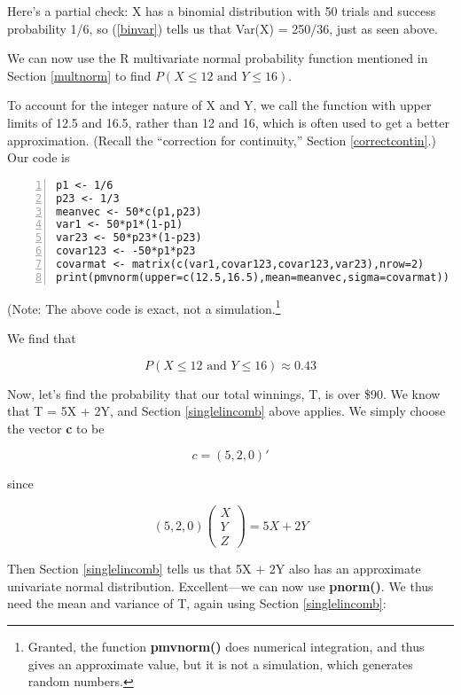 Here's a partial check:  X has a binomial distribution with 50 trials
and success probability 1/6, so (\ref{binvar}) tells us that Var(X) =
250/36, just as seen above.

We can now use the R multivariate normal probability function mentioned
in Section \ref{multnorm} to find $P(X \leq 12 \textrm{ and } Y \leq
16)$.

To account for the integer nature of X and Y, we call the function with
upper limits of 12.5 and 16.5, rather than 12 and 16, which is often
used to get a better approximation.  (Recall the ``correction for
continuity,'' Section \ref{correctcontin}.) Our code is

\begin{Verbatim}[fontsize=\relsize{-2},numbers=left]
p1 <- 1/6
p23 <- 1/3
meanvec <- 50*c(p1,p23)
var1 <- 50*p1*(1-p1)
var23 <- 50*p23*(1-p23)
covar123 <- -50*p1*p23
covarmat <- matrix(c(var1,covar123,covar123,var23),nrow=2)
print(pmvnorm(upper=c(12.5,16.5),mean=meanvec,sigma=covarmat))
\end{Verbatim}

(Note:  The above code is exact, not a simulation.\footnote{Granted, the
function {\bf pmvnorm()} does numerical integration, and thus gives an
approximate value, but it is not a simulation, which generates random
numbers.}

We find that 

\begin{equation}
P(X \leq 12 \textrm{ and } Y \leq 16) \approx 0.43
\end{equation}

Now, let's find the probability that our total winnings, T, is over
\$90.  We know that T = 5X + 2Y, and Section \ref{singlelincomb} above
applies.  We simply choose the vector {\bf c} to be

\begin{equation}
c = (5,2,0)'
\end{equation}

since

\begin{equation}
(5,2,0) 
\left (
\begin{array}{c}
X \\
Y \\
Z 
\end{array}
\right )
=  5X + 2Y
\end{equation}

Then Section \ref{singlelincomb} tells us that 5X + 2Y also has an
approximate univariate normal distribution.  Excellent---we can now use
{\bf pnorm()}.  We thus need the mean and variance of T, again using
Section \ref{singlelincomb}:

